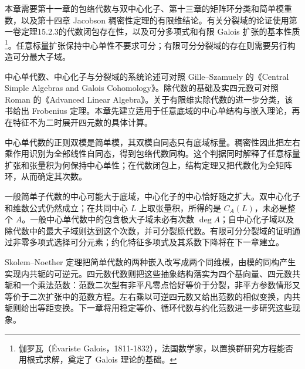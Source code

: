 本章需要第十一章的包络代数与双中心化子、第十三章的矩阵环分类和简单模重数，以及第十四章 Jacobson 稠密性定理的有限维结论。有关分裂域的论证使用第一卷定理15.2.3的代数闭包存在性，以及可分多项式和有限 Galois 扩张的基本性质\footnote{伽罗瓦（Évariste Galois，1811-1832），法国数学家，以置换群研究方程能否用根式求解，奠定了 Galois 理论的基础。}。任意标量扩张保持中心单性不要求可分；有限可分分裂域的存在则需要另行构造可分最大子域。

\ProseParagraphBreak
中心单代数、中心化子与分裂域的系统论述可对照 Gille–Szamuely 的《Central Simple Algebras and Galois Cohomology》\cite[Chapter 2, pp. 19--69]{GilleSzamuely2017CentralSimpleAlgebras}。除代数的基础及实四元数可对照 Roman 的《Advanced Linear Algebra》\cite[Chapter 18, Division Algebras and The Quaternions, pp. 462--463; Theorem 18.10, p. 463]{Roman2008AdvancedLinearAlgebra}。关于有限维实除代数的进一步分类，该书\cite[Theorem 18.12, pp. 466--469]{Roman2008AdvancedLinearAlgebra}给出 Frobenius 定理。本章先建立适用于任意底域的中心单结构与嵌入理论，再在特征不为二时展开四元数的具体计算。






\begin{chaptersummary}
	中心单代数的正则双模是简单模，其双模自同态只有底域标量。稠密性因此把左右乘作用识别为全部线性自同态，得到包络代数同构。这个判据同时解释了任意标量扩张和张量积为何保持中心单性；在代数闭包上，结构定理又把代数化为全矩阵环，从而确定其次数。

	\ProseParagraphBreak
	一般简单子代数的中心可能大于底域，中心化子的中心恰好随之扩大。双中心化子和维数公式仍然成立；在共同中心 \(L\) 上取张量积，所得的是 \(C_A(L)\)，未必是整个 \(A\)。一般中心单代数中的包含极大子域未必有次数 \(\deg A\)；自中心化子域以及除代数中的最大子域则达到这个次数，并可分裂原代数。有限可分分裂域的证明通过非零多项式选择可分元素；约化特征多项式及其系数下降将在下一章建立。

	\ProseParagraphBreak
	Skolem–Noether 定理把简单代数的两种嵌入改写成两个同维模，由模的同构产生实现内共轭的可逆元。四元数代数则把这些抽象结构落实为四个基向量、四元数共轭和一个乘法范数：范数二次型有非平凡零点恰好等价于分裂，非平方参数情形又等价于二次扩张中的范数方程。左右乘以可逆四元数又给出范数的相似变换，内共轭则给出等距变换。下一章将用稳定等价、循环代数与约化范数进一步研究这些现象。
\end{chaptersummary}

\BookExercises

